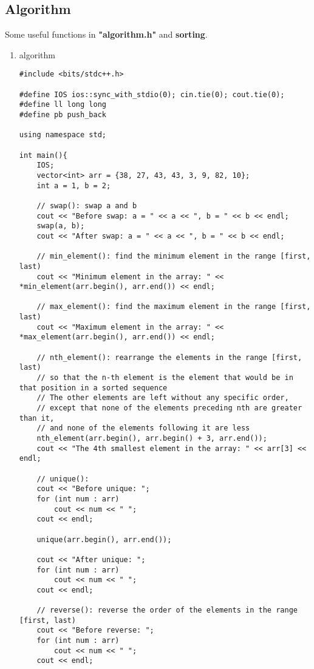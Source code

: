 \documentclass[12pt, a4paper]{article}
\begin{document}
\subsection{Algorithm}
Some useful functions in \textbf{"algorithm.h"} and \textbf{sorting}.
\begin{enumerate}
\item algorithm

\begin{lstlisting}
#include <bits/stdc++.h>

#define IOS ios::sync_with_stdio(0); cin.tie(0); cout.tie(0);
#define ll long long
#define pb push_back

using namespace std;

int main(){
    IOS;
    vector<int> arr = {38, 27, 43, 43, 3, 9, 82, 10};
    int a = 1, b = 2;

    // swap(): swap a and b
    cout << "Before swap: a = " << a << ", b = " << b << endl;
    swap(a, b);
    cout << "After swap: a = " << a << ", b = " << b << endl;

    // min_element(): find the minimum element in the range [first, last)
    cout << "Minimum element in the array: " << *min_element(arr.begin(), arr.end()) << endl;

    // max_element(): find the maximum element in the range [first, last)
    cout << "Maximum element in the array: " << *max_element(arr.begin(), arr.end()) << endl;

    // nth_element(): rearrange the elements in the range [first, last) 
    // so that the n-th element is the element that would be in that position in a sorted sequence
    // The other elements are left without any specific order, 
    // except that none of the elements preceding nth are greater than it, 
    // and none of the elements following it are less
    nth_element(arr.begin(), arr.begin() + 3, arr.end());
    cout << "The 4th smallest element in the array: " << arr[3] << endl;

    // unique():
    cout << "Before unique: ";
    for (int num : arr)
        cout << num << " ";
    cout << endl;
    
    unique(arr.begin(), arr.end());

    cout << "After unique: ";
    for (int num : arr)
        cout << num << " ";
    cout << endl;

    // reverse(): reverse the order of the elements in the range [first, last)
    cout << "Before reverse: ";
    for (int num : arr)
        cout << num << " ";
    cout << endl;


\end{lstlisting}
\end{enumerate}
\end{document}
